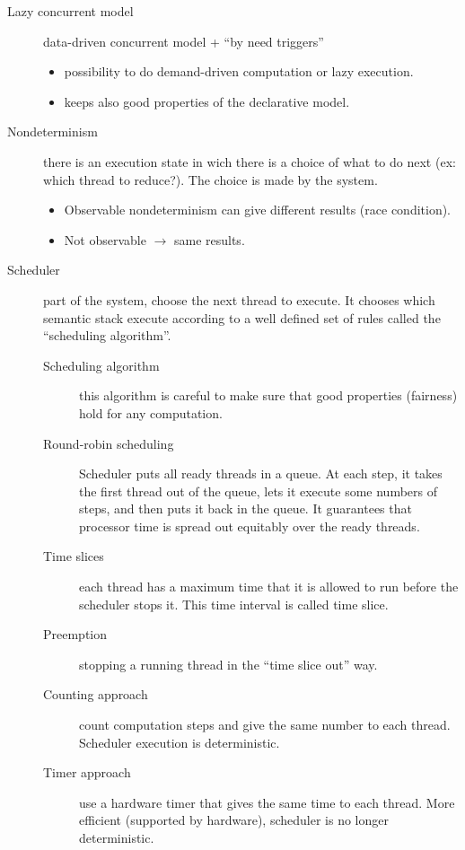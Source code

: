\begin{description}
  \item[Lazy concurrent model] data-driven concurrent model + ``by need triggers''
    \begin{itemize}
      \item possibility to do demand-driven computation or lazy execution.
      \item keeps also good properties of the declarative model.
    \end{itemize}
  \item[Nondeterminism] there is an execution state in wich there is a choice of what to do next (ex: which thread to reduce?).
    The choice is made by the system.
    \begin{itemize}
      \item Observable nondeterminism can give different results (race condition).
      \item Not observable $\rightarrow$ same results.
    \end{itemize}
  \item[Scheduler] part of the system, choose the next thread to execute.
    It chooses which semantic stack execute according to a well defined set of rules called the ``scheduling algorithm''.
    \begin{description}
      \item[Scheduling algorithm] this algorithm is careful to make sure that good properties (fairness) hold for any computation.
      \item[Round-robin scheduling] Scheduler puts all ready threads in a queue.
        At each step, it takes the first thread out of the queue, lets it execute some numbers of steps, and then puts it back in the queue.
        It guarantees that processor time is spread out equitably over the ready threads.
      \item[Time slices] each thread has a maximum time that it is allowed to run before the scheduler stops it.
        This time interval is called time slice.
      \item[Preemption] stopping a running thread in the ``time slice out'' way.
      \item[Counting approach] count computation steps and give the same number to each thread.
        Scheduler execution is deterministic.
      \item[Timer approach] use a hardware timer that gives the same time to each thread.
        More efficient (supported by hardware), scheduler is no longer deterministic.
    \end{description}

\end{description}
